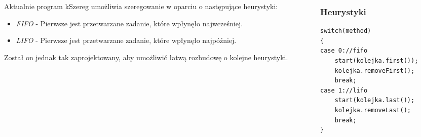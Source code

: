 \documentclass{prezentacja}
\begin{document}
\begin{frame}[fragile]
    \begin{columns}
        \begin{column}{.55\textwidth}
            \footnotesize
            Aktualnie program kSzereg umożliwia szeregowanie w oparciu o następujące heurystyki:
            \begin{itemize}
                \normalsize
                \item\emph{FIFO} - Pierwsze jest przetwarzane zadanie, które wpłynęło najwcześniej\cite{jobSlack}.
                \item\emph{LIFO} - Pierwsze jest przetwarzane zadanie, które wpłynęło najpóźniej\cite{jobSlack}.
            \end{itemize}
            Został on jednak tak zaprojektowany, aby umożliwić łatwą rozbudowę o kolejne heurystyki. 
        \end{column}
        \begin{column}{.45\textwidth}
            \frametitle{Heurystyki}
            \begin{lstlisting}
switch(method)
{
case 0://fifo
    start(kolejka.first());
    kolejka.removeFirst();
    break;
case 1://lifo
    start(kolejka.last());
    kolejka.removeLast();
    break;
}
            \end{lstlisting}
        \end{column}
    \end{columns}
\end{frame}
\end{document}
